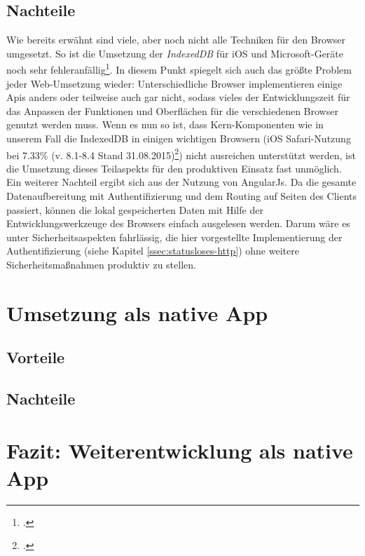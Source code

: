\subsection{Nachteile}
\label{sec:nachteile-SPA}
Wie bereits erwähnt sind viele, aber noch nicht alle Techniken für den Browser umgesetzt. So ist die Umsetzung der \textit{IndexedDB} für iOS und Microsoft-Geräte noch sehr fehleranfällig\footcite{online:caniuse:indexedDB}. In diesem Punkt spiegelt sich auch das größte Problem jeder Web-Umsetzung wieder: Unterschiedliche Browser implementieren einige Apis anders oder teilweise auch gar nicht, sodass vieles der Entwicklungszeit für das Anpassen der Funktionen und Oberflächen für die verschiedenen Browser genutzt werden muss. Wenn es nun so ist, dass Kern-Komponenten wie in unserem Fall die IndexedDB in einigen wichtigen Browsern (iOS Safari-Nutzung bei 7.33\% (v. 8.1-8.4 Stand 31.08.2015)\footcite{online:caniuse:indexedDB}) nicht ausreichen unterstützt werden, ist die Umsetzung dieses Teilaspekts für den produktiven Einsatz fast unmöglich. \\
Ein weiterer Nachteil ergibt sich aus der Nutzung von AngularJs. Da die gesamte Datenaufbereitung mit Authentifizierung und dem Routing auf Seiten des Clients passiert, können die lokal gespeicherten Daten mit Hilfe der Entwicklungswerkzeuge des Browsers einfach ausgelesen werden. Darum wäre es unter Sicherheitsaspekten fahrlässig, die hier vorgestellte Implementierung der Authentifizierung (siehe Kapitel \ref{ssec:statusloses-http}) ohne weitere Sicherheitsmaßnahmen produktiv zu stellen.

\section{Umsetzung als native App}
\label{sec:gegenueberstellung-native-app}

\subsection{Vorteile}
\label{sec:vorteile-native-app}

\subsection{Nachteile}
\label{sec:nachteile-native-app}

\section{Fazit: Weiterentwicklung als native App}
\label{sec:gegenueberstellung-fazit}
